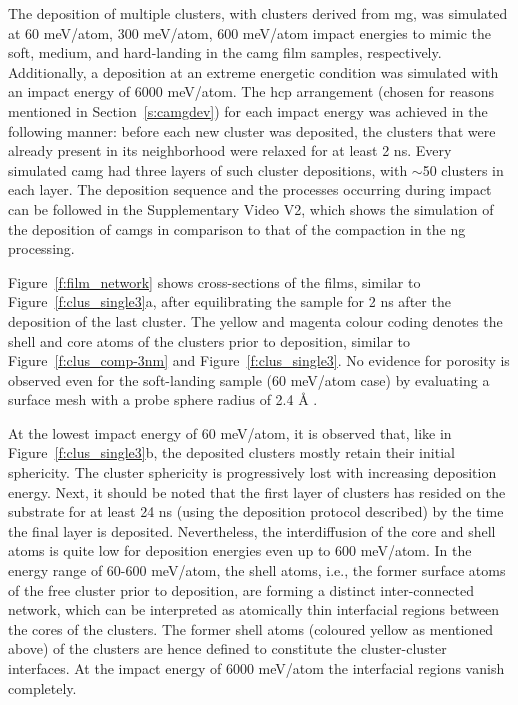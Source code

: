 \begin{changebar}
The deposition of multiple clusters, with clusters derived from  \cz \gls{mg}, was simulated at 60 meV/atom, 300 meV/atom, 600 meV/atom impact energies to mimic the soft, medium, and hard-landing in the \gls{camg} film samples, respectively. Additionally, a deposition at an extreme energetic condition was simulated with an impact energy of 6000 meV/atom. The \gls{hcp} arrangement (chosen for reasons mentioned in Section~\ref{s:camgdev}) for each impact energy was achieved in the following manner: before each new cluster was deposited, the clusters that were already present in its neighborhood were relaxed for at least 2 ns. Every simulated \gls{camg} had three layers of such cluster depositions, with $\sim$50 clusters in each layer. The deposition sequence and the processes occurring during impact can be followed in the Supplementary Video V2, which shows the simulation of the deposition of \gls{camg}s in comparison to that of the compaction in the \gls{ng} processing. \par

Figure~\ref{f:film_network} shows cross-sections of the films, similar to Figure~\ref{f:clus_single3}a, after equilibrating the sample for 2 ns after the deposition of the last cluster. The yellow and magenta colour coding denotes the shell and core atoms of the clusters prior to deposition, similar to Figure~\ref{f:clus_comp-3nm} and Figure~\ref{f:clus_single3}. No evidence for porosity is observed even for the soft-landing sample (60 meV/atom case) by evaluating a surface mesh with a probe sphere radius of 2.4 \r{A} \cite{Stukowski2010a,Stukowski2014}. \par

At the lowest impact energy of 60 meV/atom, it is observed that, like in Figure~\ref{f:clus_single3}b, the deposited clusters mostly retain their initial sphericity. The cluster sphericity is progressively lost with increasing deposition energy. Next, it should be noted that the first layer of clusters has resided on the substrate for at least 24 ns (using the deposition protocol described) by the time the final layer is deposited. Nevertheless, the interdiffusion of the core and shell atoms is quite low for deposition energies even up to 600 meV/atom. In the energy range of 60-600 meV/atom, the shell atoms, i.e., the former surface atoms of the free cluster prior to deposition, are forming a distinct inter-connected network, which can be interpreted as atomically thin interfacial regions between the cores of the clusters. The former shell atoms (coloured yellow as mentioned above)
of the clusters are hence defined to constitute the cluster-cluster interfaces. At the impact energy of 6000 meV/atom the interfacial regions vanish completely. \par


\end{changebar}
